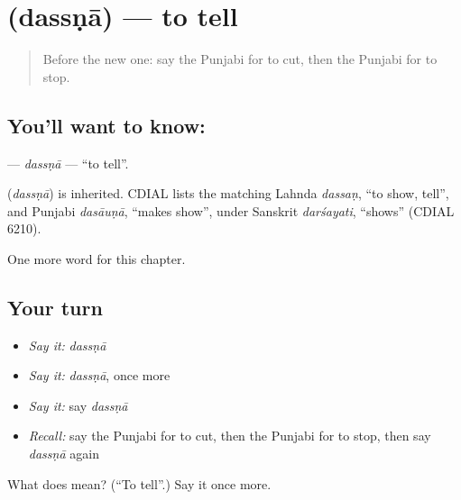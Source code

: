 \section[\texorpdfstring{\pa{ਦੱਸਣਾ} (dassṇā)}{ਦੱਸਣਾ (dassṇā)}]{ (dassṇā) — to tell}

\label{lesson:PA-C61-dassna}



\begin{quote}
Before the new one: say the Punjabi for to cut, then the Punjabi for to stop.
\end{quote}

\subsection*{You'll want to know: }
\textbf{} — \emph{dassṇā} — \textquotedblleft{}to tell\textquotedblright{}.

\begin{cousinweb}
\textbf{} (\emph{dassṇā}) is inherited. CDIAL lists the matching Lahnda \emph{dassaṇ}, \textquotedblleft{}to show, tell\textquotedblright{}, and Punjabi \emph{dasāuṇā}, \textquotedblleft{}makes show\textquotedblright{}, under Sanskrit \emph{darśayati}, \textquotedblleft{}shows\textquotedblright{} (CDIAL 6210).
\end{cousinweb}

\begin{grammarlens}[title={What you've built}]
One more word for this chapter.
\end{grammarlens}

\subsection*{Your turn}
\begin{itemize}
\raggedright
  \item \emph{Say it:} \emph{dassṇā}
  \item \emph{Say it:} \emph{dassṇā}, once more
  \item \emph{Say it:} say \emph{dassṇā}
  \item \emph{Recall:} say the Punjabi for to cut, then the Punjabi for to stop, then say \emph{dassṇā} again
\end{itemize}

\begin{tcolorbox}[breakable,colback=teal!4,colframe=teal!35!black,title={Before you move on}]
What does  mean? (\textquotedblleft{}To tell\textquotedblright{}.) Say it once more.
\end{tcolorbox}
